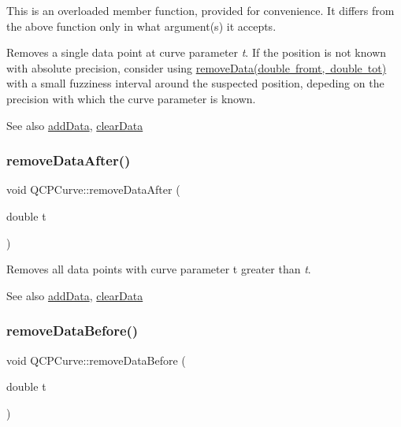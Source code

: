 This is an overloaded member function, provided for convenience. It differs from the above function only in what argument(s) it accepts.

Removes a single data point at curve parameter {\itshape t}. If the position is not known with absolute precision, consider using \mbox{\hyperlink{class_q_c_p_curve_ad45bb5479be799163028ef2b776f7221}{remove\+Data(double fromt, double tot)}} with a small fuzziness interval around the suspected position, depeding on the precision with which the curve parameter is known.

\begin{DoxySeeAlso}{See also}
\mbox{\hyperlink{class_q_c_p_curve_a4e24023c3b9ac75440c7a260172c99af}{add\+Data}}, \mbox{\hyperlink{class_q_c_p_curve_ae0462c61dbfbac07db0736ec64110241}{clear\+Data}} 
\end{DoxySeeAlso}
\mbox{\label{class_q_c_p_curve_a0365cb947c4e6d405ee22e00191d5f52}} 
\subsubsection{\texorpdfstring{remove\+Data\+After()}{removeDataAfter()}}
{\footnotesize\ttfamily void Q\+C\+P\+Curve\+::remove\+Data\+After (\begin{DoxyParamCaption}\item[{double}]{t }\end{DoxyParamCaption})}

Removes all data points with curve parameter t greater than {\itshape t}. \begin{DoxySeeAlso}{See also}
\mbox{\hyperlink{class_q_c_p_curve_a4e24023c3b9ac75440c7a260172c99af}{add\+Data}}, \mbox{\hyperlink{class_q_c_p_curve_ae0462c61dbfbac07db0736ec64110241}{clear\+Data}} 
\end{DoxySeeAlso}
\mbox{\label{class_q_c_p_curve_af6f4284fbc2f34e676f24dce03c34fe5}} 
\subsubsection{\texorpdfstring{remove\+Data\+Before()}{removeDataBefore()}}
{\footnotesize\ttfamily void Q\+C\+P\+Curve\+::remove\+Data\+Before (\begin{DoxyParamCaption}\item[{double}]{t }\end{DoxyParamCaption})}

